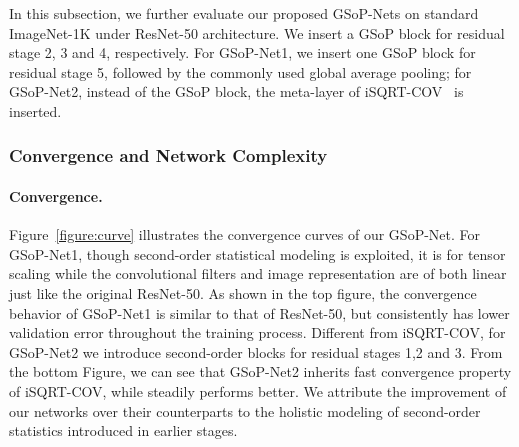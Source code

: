 \documentclass[10pt,twocolumn,letterpaper]{article}
\begin{document}
In this subsection, we further evaluate our proposed GSoP-Nets on standard ImageNet-1K under ResNet-50 architecture.  We insert a GSoP block  for residual stage 2, 3 and 4, respectively. For GSoP-Net1, we insert one GSoP block for residual  stage 5, followed by the commonly used global average pooling; for GSoP-Net2, instead of the GSoP block, the meta-layer of iSQRT-COV~\cite{Li_2018_CVPR}  is inserted. 

\subsubsection{Convergence and Network Complexity} 

\vspace{-2pt}\paragraph{Convergence.} Figure~\ref{figure:curve} illustrates the convergence curves  of our GSoP-Net. For GSoP-Net1, though second-order statistical modeling is exploited, it is  for tensor scaling while the convolutional filters and image representation are of both linear just like the original ResNet-50. As shown in the top figure, the convergence behavior of GSoP-Net1  is similar to that of ResNet-50, but consistently has lower validation error throughout the training process. Different from iSQRT-COV, for GSoP-Net2 we introduce  second-order blocks for residual stages 1,2 and 3. From the bottom Figure, we can see that GSoP-Net2 inherits fast convergence property of iSQRT-COV, while steadily performs better.  We attribute the improvement of our networks over their counterparts  to the holistic modeling of second-order statistics introduced in earlier stages. 
\end{document}
